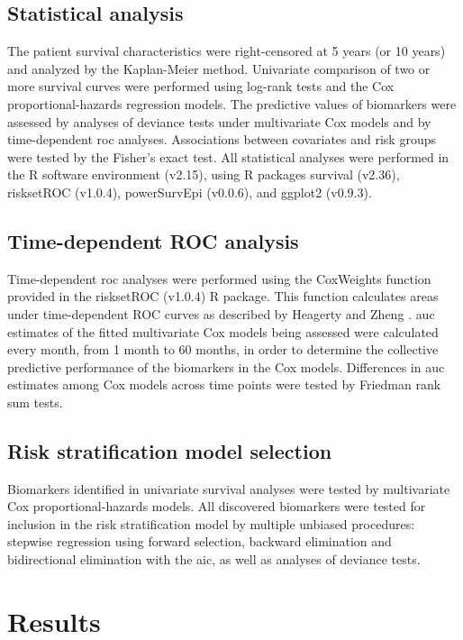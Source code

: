 \subsection{Statistical analysis}

The patient survival characteristics were right-censored at 5 years (or 10 years) and analyzed by the Kaplan-Meier method. Univariate comparison of two or more survival curves were performed using log-rank tests and the Cox proportional-hazards regression models. The predictive values of biomarkers were assessed by analyses of deviance tests under multivariate Cox models and by time-dependent \gls{roc} analyses. Associations between covariates and risk groups were tested by the Fisher’s exact test. All statistical analyses were performed in the R software environment (v2.15), using R packages survival (v2.36), risksetROC (v1.0.4), powerSurvEpi (v0.0.6), and ggplot2 (v0.9.3).

\subsection{Time-dependent ROC analysis}

Time-dependent \gls{roc} analyses were performed using the CoxWeights function provided in the risksetROC (v1.0.4) R package. This function calculates areas under time-dependent ROC curves as described by Heagerty and Zheng . \gls{auc} estimates of the fitted multivariate Cox models being assessed were calculated every month, from 1 month to 60 months, in order to determine the collective predictive performance of the biomarkers in the Cox models. Differences in \gls{auc} estimates among Cox models across time points were tested by Friedman rank sum tests.

\subsection{Risk stratification model selection}

Biomarkers identified in univariate survival analyses were tested by multivariate Cox proportional-hazards models. All discovered biomarkers were tested for inclusion in the risk stratification model by multiple unbiased procedures: stepwise regression using forward selection, backward elimination and bidirectional elimination with the \gls{aic}, as well as analyses of deviance tests.


\section{Results}

